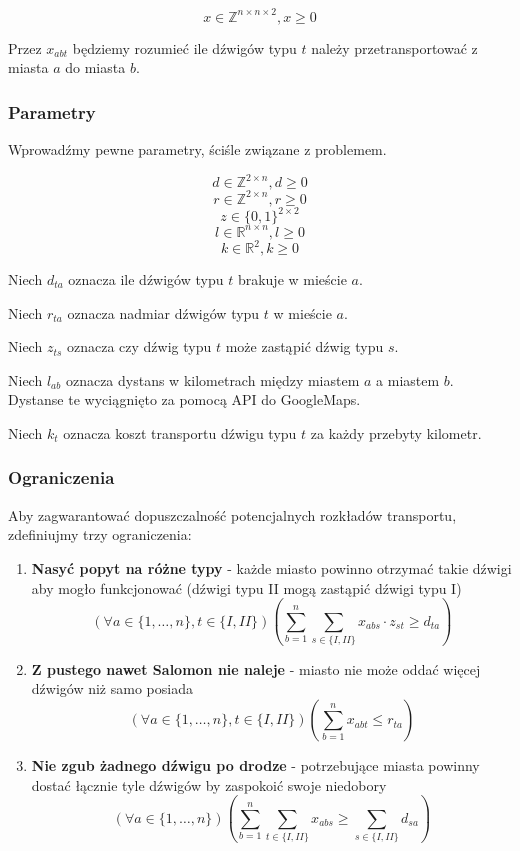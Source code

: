 \documentclass{article}
\theoremstyle{definition}
\theoremstyle{remark}
\theoremstyle{plain}
\theoremstyle{remark}
\theoremstyle{plain}
\begin{document}
\[ x \in \mathbb{Z}^{n\times n\times 2}, x \geq 0 \]

Przez $x_{abt}$ będziemy rozumieć ile dźwigów typu $t$ należy przetransportować z miasta $a$ do miasta $b$.

\subsubsection{Parametry}
Wprowadźmy pewne parametry, ściśle związane z problemem.

\[ d \in \mathbb{Z}^{2\times n}, d \geq 0 \]
\[ r \in \mathbb{Z}^{2\times n}, r \geq 0 \]
\[ z \in \{0,1\}^{2\times 2} \]
\[ l \in \mathbb{R}^{n\times n}, l \geq 0 \]
\[ k \in \mathbb{R}^{2}, k \geq 0 \]

Niech $d_{ta}$ oznacza ile dźwigów typu $t$ brakuje w mieście $a$.

Niech $r_{ta}$ oznacza nadmiar dźwigów typu $t$ w mieście $a$.

Niech $z_{ts}$ oznacza czy dźwig typu $t$ może zastąpić dźwig typu $s$.

Niech $l_{ab}$ oznacza dystans w kilometrach między miastem $a$ a miastem $b$.
Dystanse te wyciągnięto za pomocą API do GoogleMaps.

Niech $k_t$ oznacza koszt transportu dźwigu typu $t$ za każdy przebyty kilometr.

\subsubsection{Ograniczenia}
Aby zagwarantować dopuszczalność potencjalnych rozkładów transportu, zdefiniujmy trzy ograniczenia:
\begin{enumerate}
    \item \textbf{Nasyć popyt na różne typy} - każde miasto powinno otrzymać takie dźwigi aby mogło funkcjonować (dźwigi typu II mogą zastąpić dźwigi typu I)
    \[ (\forall a \in \{1,\dots,n\}, t \in \{I,II\}) \left(\sum_{b=1}^{n}{\sum_{s \in \{I,II\}}{x_{abs} \cdot z_{st}}} \geq d_{ta} \right) \]

    \item \textbf{Z pustego nawet Salomon nie naleje} - miasto nie może oddać więcej dźwigów niż samo posiada
    \[ (\forall a \in \{1,\dots,n\}, t \in \{I,II\}) \left(\sum_{b=1}^{n}{x_{abt}} \leq r_{ta} \right) \]

    \item \textbf{Nie zgub żadnego dźwigu po drodze} - potrzebujące miasta powinny dostać łącznie tyle dźwigów by zaspokoić swoje niedobory
    \[ (\forall a \in \{1,\dots,n\}) \left(\sum_{b=1}^{n}{\sum_{t \in \{I,II\}}{x_{abs}}} \geq \sum_{s \in \{I, II\}}{d_{sa}} \right) \]
\end{enumerate}
\end{document}
